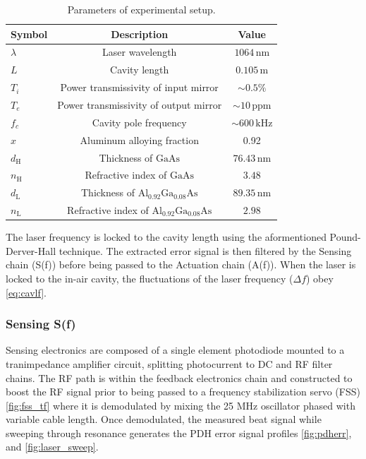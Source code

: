 \begin{table}[h!]
\caption{Parameters of experimental setup.}
\centering 
\begin{tabular}{lcc}
    \hline \hline
    Symbol & Description & Value \\
    \hline
    $\lambda$ & Laser wavelength & $1064 \, \mathrm{nm}$ \\
    $L$ & Cavity length & $0.105\, \mathrm{m}$ \\
    $T_i$ & Power transmissivity of input mirror & $\sim0.5\%$ \\
    $T_e$ & Power transmissivity of output mirror & $\sim10\, \mathrm{ppm}$ \\
    $f_c$ & Cavity pole frequency & $\sim600\, \mathrm{kHz}$ \\
    $x$ & Aluminum alloying fraction & 0.92 \\
    $d_{\mathrm{H}}$ & Thickness of $\mathrm{GaAs}$ & $76.43\, \mathrm{nm}$ \\
    $n_{\mathrm{H}}$ & Refractive index of $\mathrm{GaAs}$ & $3.48$ \\
    $d_{\mathrm{L}}$ & Thickness of $\mathrm{Al_{0.92}Ga_{0.08}As}$ & $89.35\, \mathrm{nm}$ \\
    $n_{\mathrm{L}}$ & Refractive index of $\mathrm{Al_{0.92}Ga_{0.08}As}$ & $2.98$ \\
    \hline \hline
\end{tabular} \label{table:cav_params}
\end{table}

The laser frequency is locked to the cavity length using the aformentioned Pound-Derver-Hall technique. The extracted error signal is then filtered by the Sensing chain (S(f)) before being passed to the Actuation chain (A(f)). When the laser is locked to the in-air cavity, the fluctuations of the laser frequency ($\Delta f$) obey \autoref{eq:cavlf}. 

\subsubsection{Sensing S(f)}
Sensing electronics are composed of a single element photodiode mounted to a tranimpedance amplifier circuit, splitting photocurrent to DC and RF filter chains. The RF path is within the feedback electronics chain and constructed to boost the RF signal prior to being passed to a frequency stabilization servo (FSS) \autoref{fig:fss_tf} where it is demodulated by mixing the 25 MHz oscillator phased with variable cable length. Once demodulated, the measured beat signal while sweeping through resonance generates the PDH error signal profiles \autoref{fig:pdherr}, and \autoref{fig:laser_sweep}.

